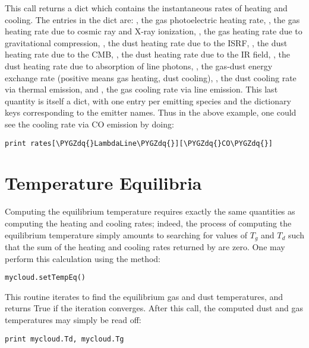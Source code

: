 \documentclass[letterpaper,10pt,english]{sphinxmanual}
\def\PYGZdq{\char`\"}
\begin{document}
This call returns a dict which contains the instantaneous rates of
heating and cooling. The entries in the dict are: , the gas
photoelectric heating rate, , the gas heating rate due to
cosmic ray and X-ray ionization, , the gas heating rate due
to gravitational compression, , the dust heating rate
due to the ISRF, , the dust heating rate due to the CMB,
, the dust heating rate due to the IR field,
, the dust heating rate due to absorption of line
photons, , the gas-dust energy exchange rate (positive means
gas heating, dust cooling), , the dust cooling rate via
thermal emission, and , the gas cooling rate via line
emission. This last quantity is itself a dict, with one entry per
emitting species and the dictionary keys corresponding to the emitter
names. Thus in the above example, one could see the cooling rate via
CO emission by doing:

\begin{Verbatim}[commandchars=\\\{\}]
print rates[\PYGZdq{}LambdaLine\PYGZdq{}][\PYGZdq{}CO\PYGZdq{}]
\end{Verbatim}


\section{Temperature Equilibria}
\label{functions:ssec-temp-eq}\label{functions:temperature-equilibria}
Computing the equilibrium temperature requires exactly the same
quantities as computing the heating and cooling rates; indeed, the
process of computing the equilibrium temperature simply amounts to
searching for values of \(T_g\) and \(T_d\) such that the sum
of the heating and cooling rates returned by  are zero. One
may perform this calculation using the  method:

\begin{Verbatim}[commandchars=\\\{\}]
mycloud.setTempEq()
\end{Verbatim}

This routine iterates to find the equilibrium gas and dust
temperatures, and returns True if the iteration converges. After this
call, the computed dust and gas temperatures may simply be read off:

\begin{Verbatim}[commandchars=\\\{\}]
print mycloud.Td, mycloud.Tg
\end{Verbatim}
\end{document}
